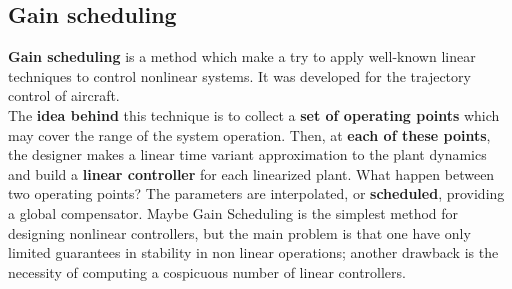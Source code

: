 \subsection{Gain scheduling}
\textbf{Gain scheduling} is a method which make a try to apply well-known linear techniques to control nonlinear systems. It was developed for the trajectory control of aircraft. \\
The \textbf{idea behind} this technique is to collect a \textbf{set of operating points} which may cover the range of the system operation. Then, at \textbf{each of these points}, the designer makes a linear time variant approximation to the plant dynamics and build a \textbf{linear controller} for each linearized plant. What happen between two operating points? The parameters are interpolated, or \textbf{scheduled}, providing a global compensator. Maybe Gain Scheduling is the simplest method for designing nonlinear controllers, but the main problem is that one have only limited guarantees in stability in non linear operations; another drawback is the necessity of computing a cospicuous number of linear controllers.
